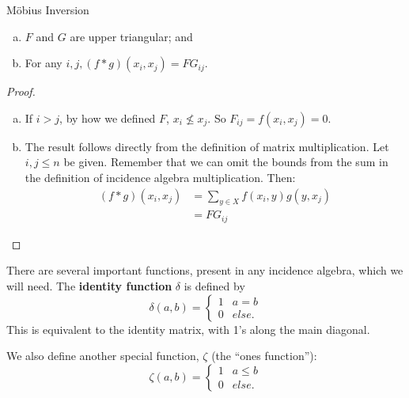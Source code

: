 \documentclass[12pt]{pom_thesis}
\begin{document}
\begin{chapter}{M\"obius Inversion}
\begin{lemma}
\begin{enumerate}[a)]
\item $F$ and $G$ are upper triangular; and
\item For any $i,j, (f * g)(x_i, x_j)=FG_{ij}$.
\end{enumerate}
\end{lemma}
\begin{proof}
\begin{enumerate}[a)]
\item If $i>j$, by how we defined $F$, $x_i \nleq x_j$. So $F_{ij} = f(x_i, x_j) = 0$. 
\item
The result follows directly from the definition of matrix multiplication. Let $i,j\leq n$ be given. Remember that we can omit the bounds from the sum in the definition of incidence algebra multiplication. Then:
\begin{align*}
(f * g)(x_i, x_j) &= \sum_{y \in X} f(x_i,y)g(y,x_j)\\
&=FG_{ij}
\end{align*}
\end{enumerate}
\end{proof}


There are several important functions, present in any incidence algebra, which we will need. 
The \textbf{identity function} $\delta$ is defined by 
\[\delta(a,b) = \begin{cases} 1 & a = b \\ 0 & else. \end{cases}
\]
This is equivalent to the identity matrix, with 1's along the main diagonal.

We also define another special function, $\zeta$ (the ``ones function''):
\[
\zeta(a,b) = \begin{cases} 1 & a \leq b \\ 0 & else. \end{cases}
\]


\end{chapter}
\end{document}
